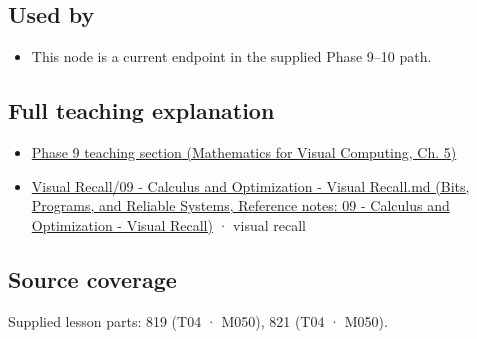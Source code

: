 \subsection{Used by}\label{appendix-e2d476574aab-used-by}

\begin{itemize}
\tightlist
\item
  This node is a current endpoint in the supplied Phase 9--10 path.
\end{itemize}

\subsection{Full teaching explanation}\label{appendix-e2d476574aab-full-teaching-explanation}

\begin{itemize}
\tightlist
\item
  \href{../02-Mathematics-for-Visual-Computing/main.pdf\#nameddest=02-foundations-ii-ch021-multivariable-derivatives-and-sensitivity-1}{Phase 9 teaching section (Mathematics for Visual Computing, Ch. 5)}
\item
  \href{../01-Bits-Programs-and-Reliable-Systems/main.pdf\#nameddest=appendix-adf48f5dc5c1}{Visual Recall/09 - Calculus and Optimization - Visual Recall.md (Bits, Programs, and Reliable Systems, Reference notes: 09 - Calculus and Optimization - Visual Recall)} · visual recall
\end{itemize}

\subsection{Source coverage}\label{appendix-e2d476574aab-source-coverage}

Supplied lesson parts: 819 (T04 · M050), 821 (T04 · M050).
